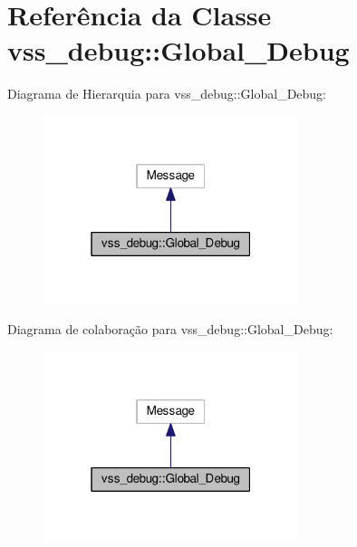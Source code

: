 \hypertarget{classvss__debug_1_1Global__Debug}{}\section{Referência da Classe vss\+\_\+debug\+:\+:Global\+\_\+\+Debug}
\label{classvss__debug_1_1Global__Debug}


Diagrama de Hierarquia para vss\+\_\+debug\+:\+:Global\+\_\+\+Debug\+:\nopagebreak
\begin{figure}[H]
\begin{center}
\leavevmode
\includegraphics[width=211pt]{classvss__debug_1_1Global__Debug__inherit__graph}
\end{center}
\end{figure}


Diagrama de colaboração para vss\+\_\+debug\+:\+:Global\+\_\+\+Debug\+:\nopagebreak
\begin{figure}[H]
\begin{center}
\leavevmode
\includegraphics[width=211pt]{classvss__debug_1_1Global__Debug__coll__graph}
\end{center}
\end{figure}

